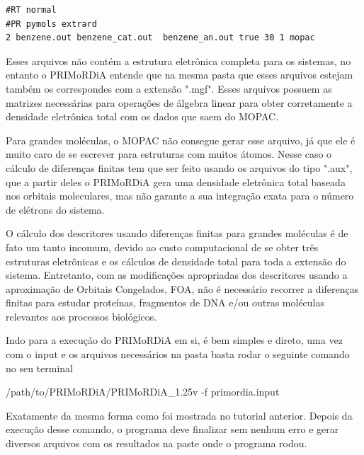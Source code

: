 \documentclass[a4paper,11pt]{refart}
\begin{document}
\hspace*{-\leftmarginwidth}
\begin{minipage}{\fullwidth}
\begin{lstlisting}[caption={Input editado para execução do tutorial 2},label={tut201}]
#RT normal
#PR pymols extrard
2 benzene.out benzene_cat.out  benzene_an.out true 30 1 mopac
\end{lstlisting}
\end{minipage}

Esses arquivos não contém a estrutura eletrônica completa para os sistemas, no entanto o PRIMoRDiA entende que na mesma pasta que esses arquivos estejam também os correspondes com a extensão ".mgf". Esses arquivos possuem as matrizes necessárias para operações de álgebra linear para obter corretamente a densidade eletrônica total com os dados que saem do MOPAC. 

Para grandes moléculas, o MOPAC não consegue gerar esse arquivo, já que ele é muito caro de se escrever para estruturas com muitos átomos. Nesse caso o cálculo de diferenças finitas tem que ser feito usando os arquivos do tipo ".aux", que a partir deles o PRIMoRDiA gera uma densidade eletrônica total baseada nos orbitais moleculares, mas não garante a sua integração exata para o número de elétrons do sistema. 

O cálculo dos descritores usando diferenças finitas para grandes moléculas é de fato um tanto incomum, devido ao custo computacional de se obter três estruturas eletrônicas e os cálculos de densidade total para toda a extensão do sistema. Entretanto, com as modificações apropriadas dos descritores usando a aproximação de Orbitais Congelados, FOA, não é necessário recorrer a diferenças finitas para estudar proteínas, fragmentos de DNA e/ou outras moléculas relevantes aos processos biológicos.  

Indo para a execução do PRIMoRDiA em si, é bem simples e direto, uma vez com o input e os arquivos necessários na pasta basta rodar o seguinte comando no seu terminal


\hspace*{-\leftmarginwidth}
\begin{minipage}{\fullwidth}
	\begin{commandshell}/path/to/PRIMoRDiA/PRIMoRDiA_1.25v -f primordia.input\end{commandshell}
\end{minipage}

Exatamente da mesma forma como foi mostrada no tutorial anterior. Depois da execução desse comando, o programa deve finalizar sem nenhum erro e gerar diversos arquivos com os resultados na paste onde o programa rodou. 
\end{document}
